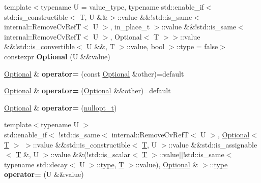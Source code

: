 \begin{DoxyCompactItemize}
\item 
\mbox{\label{classv8_1_1base_1_1Optional_a12b49e09d8dcf8bfad0c10472731e6b3}} 
{\footnotesize template$<$typename U  = value\+\_\+type, typename std\+::enable\+\_\+if$<$ std\+::is\+\_\+constructible$<$ T, U \&\&$>$\+::value \&\&!std\+::is\+\_\+same$<$ internal\+::\+Remove\+Cv\+Ref\+T$<$ U $>$, in\+\_\+place\+\_\+t $>$\+::value \&\&!std\+::is\+\_\+same$<$ internal\+::\+Remove\+Cv\+Ref\+T$<$ U $>$, Optional$<$ T $>$$>$\+::value \&\&!std\+::is\+\_\+convertible$<$ U \&\&, T $>$\+::value, bool $>$\+::type  = false$>$ }\\constexpr {\bfseries Optional} (U \&\&value)
\item 
\mbox{\label{classv8_1_1base_1_1Optional_a1db27f33265ee721e949d3d8428998ab}} 
\mbox{\hyperlink{classv8_1_1base_1_1Optional}{Optional}} \& {\bfseries operator=} (const \mbox{\hyperlink{classv8_1_1base_1_1Optional}{Optional}} \&other)=default
\item 
\mbox{\label{classv8_1_1base_1_1Optional_a2c9789f2d98689de5101df1e9da2f43e}} 
\mbox{\hyperlink{classv8_1_1base_1_1Optional}{Optional}} \& {\bfseries operator=} (\mbox{\hyperlink{classv8_1_1base_1_1Optional}{Optional}} \&\&other)=default
\item 
\mbox{\label{classv8_1_1base_1_1Optional_a7b249323ee2f1a1d1fabfaca007d1a87}} 
\mbox{\hyperlink{classv8_1_1base_1_1Optional}{Optional}} \& {\bfseries operator=} (\mbox{\hyperlink{structv8_1_1base_1_1nullopt__t}{nullopt\+\_\+t}})
\item 
\mbox{\label{classv8_1_1base_1_1Optional_a5cae544ed71ad1b7c3b375c3cef0a69b}} 
{\footnotesize template$<$typename U $>$ }\\std\+::enable\+\_\+if$<$ !std\+::is\+\_\+same$<$ internal\+::\+Remove\+Cv\+RefT$<$ U $>$, \mbox{\hyperlink{classv8_1_1base_1_1Optional}{Optional}}$<$ \mbox{\hyperlink{classv8_1_1internal_1_1torque_1_1T}{T}} $>$ $>$\+::value \&\&std\+::is\+\_\+constructible$<$ \mbox{\hyperlink{classv8_1_1internal_1_1torque_1_1T}{T}}, U $>$\+::value \&\&std\+::is\+\_\+assignable$<$ \mbox{\hyperlink{classv8_1_1internal_1_1torque_1_1T}{T}} \&, U $>$\+::value \&\&(!std\+::is\+\_\+scalar$<$ \mbox{\hyperlink{classv8_1_1internal_1_1torque_1_1T}{T}} $>$\+::value$\vert$$\vert$!std\+::is\+\_\+same$<$ typename std\+::decay$<$ U $>$\+::\mbox{\hyperlink{classstd_1_1conditional_1_1type}{type}}, \mbox{\hyperlink{classv8_1_1internal_1_1torque_1_1T}{T}} $>$\+::value), \mbox{\hyperlink{classv8_1_1base_1_1Optional}{Optional}} \& $>$\+::\mbox{\hyperlink{classstd_1_1conditional_1_1type}{type}} {\bfseries operator=} (U \&\&value)
$$
\end{DoxyCompactItemize}
